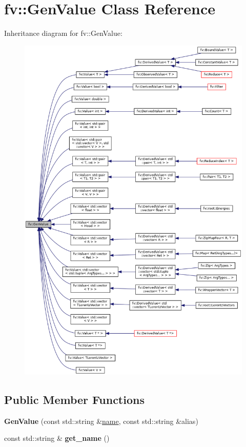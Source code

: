 \hypertarget{classfv_1_1GenValue}{}\section{fv\+:\+:Gen\+Value Class Reference}
\label{classfv_1_1GenValue}


Inheritance diagram for fv\+:\+:Gen\+Value\+:
\nopagebreak
\begin{figure}[H]
\begin{center}
\leavevmode
\includegraphics[width=350pt]{classfv_1_1GenValue__inherit__graph}
\end{center}
\end{figure}
\subsection*{Public Member Functions}
\begin{DoxyCompactItemize}
\item 
\hypertarget{classfv_1_1GenValue_a6a85db33e2414e7e77735a4706760300}{}\label{classfv_1_1GenValue_a6a85db33e2414e7e77735a4706760300} 
{\bfseries Gen\+Value} (const std\+::string \&\hyperlink{classfv_1_1GenValue_a610f89ee441eaad4c9e78f74d6bde93b}{name}, const std\+::string \&alias)
\item 
\hypertarget{classfv_1_1GenValue_a56f7eab1a0043ea73ecf01ec11dafa5c}{}\label{classfv_1_1GenValue_a56f7eab1a0043ea73ecf01ec11dafa5c} 
const std\+::string \& {\bfseries get\+\_\+name} ()
\end{DoxyCompactItemize}
